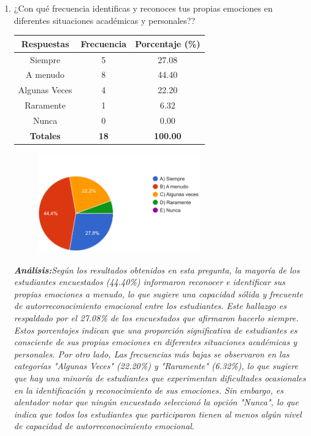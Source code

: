 \documentclass[journal]{IEEEtran}
\begin{document}
\begin{enumerate}
	
	\item ¿Con qué frecuencia identificas y reconoces tus propias emociones en diferentes situaciones académicas y personales??
	\begin{table}[H]
		\renewcommand{\arraystretch}{1.3}
		\centering
		\begin{tabular}{|c|c|c|}
			\hline
			\textbf{Respuestas} & \textbf{Frecuencia} & \textbf{Porcentaje (\%)}\\
			\hline
			Siempre & 5 & 27.08 \\
			A menudo & 8 & 44.40 \\
			Algunas Veces & 4 & 22.20\\
			Raramente & 1 & 6.32\\
			Nunca & 0 & 0.00\\
			\hline
			\textbf{Totales} &\textbf{18}& \textbf{100.00}\\
			\hline
		\end{tabular}
	\end{table}
	\begin{figure}[h]
		\centering
		\includegraphics[width=07cm]{Pregunta 1}
	\end{figure}
	\textit{\textbf{Análisis:}Según los resultados obtenidos en esta pregunta, la mayoría de los estudiantes encuestados (44.40\%) informaron reconocer e identificar sus propias emociones a menudo, lo que sugiere una capacidad sólida y frecuente de autorreconocimiento emocional entre los estudiantes. Este hallazgo es respaldado por el 27.08\% de los encuestados que afirmaron hacerlo siempre. Estos porcentajes indican que una proporción significativa de estudiantes es consciente de sus propias emociones en diferentes situaciones académicas y personales.
Por otro lado, Las frecuencias más bajas se observaron en las categorías "Algunas Veces" (22.20\%) y "Raramente" (6.32\%), lo que sugiere que hay una minoría de estudiantes que experimentan dificultades ocasionales en la identificación y reconocimiento de sus emociones. Sin embargo, es alentador notar que ningún encuestado seleccionó la opción "Nunca", lo que indica que todos los estudiantes que participaron tienen al menos algún nivel de capacidad de autorreconocimiento emocional.
}\\


\end{enumerate}
\end{document}
